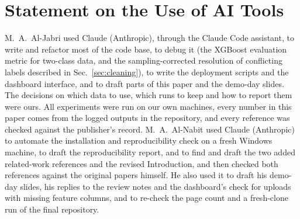 \documentclass[conference]{IEEEtran}
\begin{document}
\section*{Statement on the Use of AI Tools}
M.~A.~Al-Jabri used Claude (Anthropic), through the Claude Code assistant, to
write and refactor most of the code base, to debug it (the XGBoost evaluation
metric for two-class data, and the sampling-corrected resolution of conflicting
labels described in Sec.~\ref{sec:cleaning}), to write the deployment scripts
and the dashboard interface, and to draft parts of this paper and the
demo-day slides. The decisions
on which data to use, which runs to keep and how to report them were ours. All
experiments were run on our own machines, every number in this paper comes
from the logged outputs in the repository, and every reference was checked
against the publisher's record. M.~A.~Al-Nabit used Claude
(Anthropic) to automate the installation and reproducibility check on a fresh
Windows machine, to draft the reproducibility report, and to find and draft the
two added related-work references and the revised Introduction, and then
checked both references against the original papers himself. He also used it
to draft his demo-day slides, his replies to the review notes and the
dashboard's check for uploads with missing feature columns, and to
re-check the page count and a fresh-clone run of the final repository.



\end{document}
